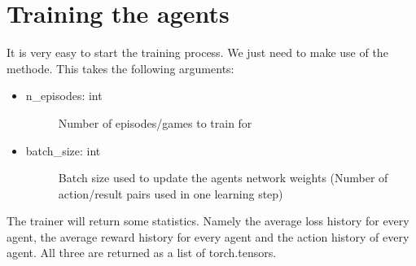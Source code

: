 \documentclass[letterpaper,10pt,english]{sphinxmanual}
\begin{document}
\section{Training the agents}
\label{\detokenize{UsingTheEnvironment:training-the-agents}}
\sphinxAtStartPar
It is very easy to start the training process. We just need to make use of the  methode. This takes the
following arguments:
\begin{itemize}
\item {} \begin{description}
\item[{n\_episodes: int}] \leavevmode
\sphinxAtStartPar
Number of episodes/games to train for

\end{description}

\item {} \begin{description}
\item[{batch\_size: int}] \leavevmode
\sphinxAtStartPar
Batch size used to update the agents network weights (Number of action/result pairs used in one learning step)

\end{description}

\end{itemize}

\sphinxAtStartPar
The trainer will return some statistics. Namely the average loss history for every agent, the average reward history
for every agent and the action history of every agent. All three are returned as a list of torch.tensors.

\sphinxAtStartPar
{}

\begin{sphinxVerbatim}[commandchars=\\\{\},numbers=left,firstnumber=1,stepnumber=1]
   
   
      
\end{sphinxVerbatim}
\end{document}
